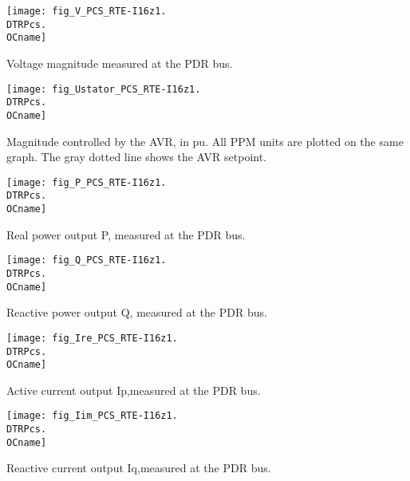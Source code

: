{%
    \noindent
    \begin{minipage}[t]{0.48\textwidth}
        \centering
        \texttt{[image: fig\_V\_PCS\_RTE-I16z1.\\DTRPcs.\\OCname]}
        \begin{minipage}[t]{0.8\textwidth}
            \small Voltage magnitude measured at the PDR bus.
        \end{minipage}
    \end{minipage}
    \hfill
    \begin{minipage}[t]{0.48\textwidth}
        \centering
        \texttt{[image: fig\_Ustator\_PCS\_RTE-I16z1.\\DTRPcs.\\OCname]}
        \begin{minipage}[t]{0.8\textwidth}
            \small Magnitude controlled by the AVR, in pu. All PPM
            units are plotted on the same graph. The gray dotted
            line shows the AVR setpoint.
        \end{minipage}
    \end{minipage}
%
    \vspace{0.5cm}
    \begin{minipage}[t]{0.48\textwidth}
        \centering
        \texttt{[image: fig\_P\_PCS\_RTE-I16z1.\\DTRPcs.\\OCname]}
        \begin{minipage}[t]{0.8\textwidth}
            \small Real power output P, measured at the PDR bus.
        \end{minipage}
    \end{minipage}
    \hfill
    \begin{minipage}[t]{0.48\textwidth}
        \centering
        \texttt{[image: fig\_Q\_PCS\_RTE-I16z1.\\DTRPcs.\\OCname]}
        \begin{minipage}[t]{0.8\textwidth}
            \small Reactive power output Q, measured at the PDR bus.
        \end{minipage}
    \end{minipage}
%
    \vspace{0.5cm}
    \begin{minipage}[t]{0.48\textwidth}
        \centering
        \texttt{[image: fig\_Ire\_PCS\_RTE-I16z1.\\DTRPcs.\\OCname]}
        \begin{minipage}[t]{0.8\textwidth}
            \small Active current output Ip,measured at the PDR bus.
        \end{minipage}
    \end{minipage}
    \hfill
    \begin{minipage}[t]{0.48\textwidth}
        \centering
        \texttt{[image: fig\_Iim\_PCS\_RTE-I16z1.\\DTRPcs.\\OCname]}
        \begin{minipage}[t]{0.8\textwidth}
            \small Reactive current output Iq,measured at the PDR bus.
        \end{minipage}
    \end{minipage}
}
